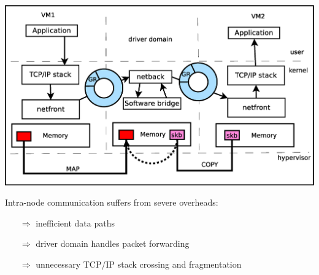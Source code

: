 \documentclass[a0paper,portrait,final]{baposter}
\newcommand{\compresslist}{%
\setlength{\itemsep}{0.2em}%
\setlength{\parskip}{0.2pt}%
\setlength{\parsep}{0.2pt}%
}
\begin{document}
\begin{poster}
{%
\begin{center}
\includegraphics[width=\linewidth]{figures/netfront_netback.eps}
\end{center}
Intra-node communication suffers from severe overheads:

\begin{itemize}
\compresslist
\item[$\Rightarrow$] inefficient data paths

\item[$\Rightarrow$] driver domain handles packet forwarding

\item[$\Rightarrow$] unnecessary TCP/IP stack crossing and fragmentation

\end{itemize}
\vspace{0.5em}

}

\end{poster}
\end{document}
